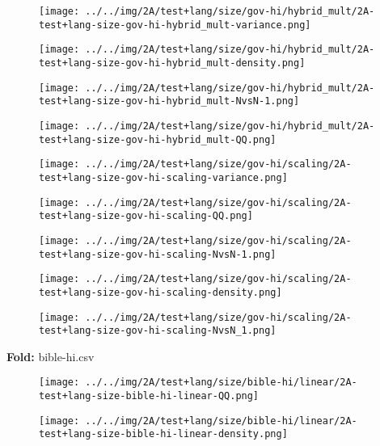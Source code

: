 \begin{figure}[H]
\centering	\texttt{[image: ../../img/2A/test+lang/size/gov-hi/hybrid\_mult/2A-test+lang-size-gov-hi-hybrid\_mult-variance.png]}
\end{figure}
\begin{figure}[H]
\centering	\texttt{[image: ../../img/2A/test+lang/size/gov-hi/hybrid\_mult/2A-test+lang-size-gov-hi-hybrid\_mult-density.png]}
\end{figure}
\begin{figure}[H]
\centering	\texttt{[image: ../../img/2A/test+lang/size/gov-hi/hybrid\_mult/2A-test+lang-size-gov-hi-hybrid\_mult-NvsN-1.png]}
\end{figure}
\begin{figure}[H]
\centering	\texttt{[image: ../../img/2A/test+lang/size/gov-hi/hybrid\_mult/2A-test+lang-size-gov-hi-hybrid\_mult-QQ.png]}
\end{figure}
\begin{figure}[H]
\centering	\texttt{[image: ../../img/2A/test+lang/size/gov-hi/scaling/2A-test+lang-size-gov-hi-scaling-variance.png]}
\end{figure}
\begin{figure}[H]
\centering	\texttt{[image: ../../img/2A/test+lang/size/gov-hi/scaling/2A-test+lang-size-gov-hi-scaling-QQ.png]}
\end{figure}
\begin{figure}[H]
\centering	\texttt{[image: ../../img/2A/test+lang/size/gov-hi/scaling/2A-test+lang-size-gov-hi-scaling-NvsN-1.png]}
\end{figure}
\begin{figure}[H]
\centering	\texttt{[image: ../../img/2A/test+lang/size/gov-hi/scaling/2A-test+lang-size-gov-hi-scaling-density.png]}
\end{figure}
\begin{figure}[H]
\centering	\texttt{[image: ../../img/2A/test+lang/size/gov-hi/scaling/2A-test+lang-size-gov-hi-scaling-NvsN\_1.png]}
\end{figure}
\textbf{Fold:} bible-hi.csv
\begin{figure}[H]
\centering	\texttt{[image: ../../img/2A/test+lang/size/bible-hi/linear/2A-test+lang-size-bible-hi-linear-QQ.png]}
\end{figure}
\begin{figure}[H]
\centering	\texttt{[image: ../../img/2A/test+lang/size/bible-hi/linear/2A-test+lang-size-bible-hi-linear-density.png]}
\end{figure}
